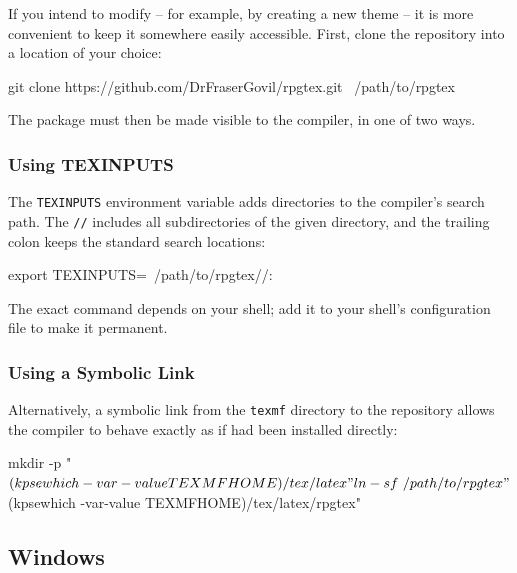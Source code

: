 			If you intend to modify \rpgtex{} -- for example, by creating a new theme -- it is more convenient to keep it somewhere easily accessible. First, clone the repository into a location of your choice:

			\begin{BashBlock}
				git clone https://github.com/DrFraserGovil/rpgtex.git ~/path/to/rpgtex
			\end{BashBlock}

			The package must then be made visible to the compiler, in one of two ways.

			\subsubsection{Using TEXINPUTS}

				The \texttt{TEXINPUTS} environment variable adds directories to the compiler's search path. The \texttt{//} includes all subdirectories of the given directory, and the trailing colon keeps the standard search locations:
				\begin{BashBlock}
					export TEXINPUTS=~/path/to/rpgtex//:
				\end{BashBlock}
				The exact command depends on your shell; add it to your shell's configuration file to make it permanent.

			\subsubsection{Using a Symbolic Link}

				Alternatively, a symbolic link from the \texttt{texmf} directory to the repository allows the compiler to behave exactly as if \rpgtex{} had been installed directly:

				\begin{BashBlock}
					mkdir -p "$(kpsewhich -var-value TEXMFHOME)/tex/latex"
ln -sf ~/path/to/rpgtex "$(kpsewhich -var-value TEXMFHOME)/tex/latex/rpgtex"
				\end{BashBlock}

		\subsection{Windows}\label{S:Windows}

